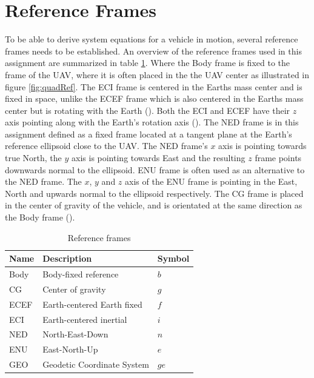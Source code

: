 \section{Reference Frames}\label{sec:refFrame}
To be able to derive system equations for a vehicle in motion, several reference frames needs to be established. An overview of the reference frames used in this assignment are summarized in table \ref{tab:refFrames}. Where the Body frame is fixed to the frame of the UAV, where it is often placed in the the UAV center as illustrated in figure \ref{fig:quadRef}. The ECI frame is centered in the Earths mass center and is fixed in space, unlike the ECEF frame which is also centered in the Earths mass center but is rotating with the Earth (\cite{Fossen2011}). Both the ECI and ECEF have their $z$ axis pointing along with the Earth's rotation axis (\cite{vik2009integrated}). The NED frame is in this assignment defined as a fixed frame located at a tangent plane at the Earth's reference ellipsoid close to the UAV. The NED frame's $x$ axis is pointing towards true North, the $y$ axis is pointing towards East and the resulting $z$ frame points downwards normal to the ellipsoid. ENU frame is often used as an alternative to the NED frame. The $x$, $y$ and $z$ axis of the ENU frame is pointing in the East, North and upwards normal to the ellipsoid respectively. The CG frame is placed in the center of gravity of the vehicle, and is orientated at the same direction as the Body frame (\cite{Fossen2011}).

\begin{table}[!htb]
  \centering
  \begin{tabular}{l l l}
    \toprule
    Name&Description&Symbol\\ \hline
    Body&Body-fixed reference&$b$\\
    CG&Center of gravity&$g$\\
    ECEF&Earth-centered Earth fixed&$f$\\ %
    ECI&Earth-centered inertial&$i$\\
    NED&North-East-Down&$n$\\
    ENU&East-North-Up&$e$\\
    GEO&Geodetic Coordinate System&$ge$\\
    \bottomrule
  \end{tabular}
  \caption{Reference frames}
  \label{tab:refFrames}
\end{table}

